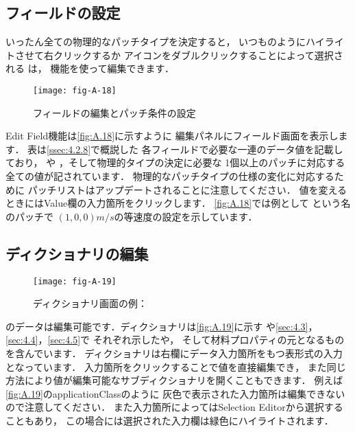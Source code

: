 \subsection{フィールドの設定}
\label{ssec:A.4.4}
いったん全ての物理的なパッチタイプを決定すると，
いつものようにハイライトさせて右クリックするか
アイコンをダブルクリックすることによって選択される
%
%
は，
機能を使って編集できます．


\begin{figure}[ht]
 \texttt{[image: fig-A-18]}
 \caption{フィールドの編集とパッチ条件の設定}
 \label{fig:A.18}
\end{figure}


Edit Field機能は\autoref{fig:A.18}に示すように
編集パネルにフィールド画面を表示します．
表は\autoref{ssec:4.2.8}で概説した
各フィールドで必要な一連のデータ値を記載しており，
%
%
や
%
%
，そして物理的タイプの決定に必要な
1個以上のパッチに対応する全ての値が記されています．
物理的なパッチタイプの仕様の変化に対応するために
パッチリストはアップデートされることに注意してください．
値を変えるときにはValue欄の入力箇所をクリックします．
\autoref{fig:A.18}では例として
という名のパッチで
$(1, 0, 0) \unit{m/s}$の等速度の設定を示しています．


\subsection{ディクショナリの編集}
\label{ssec:A.4.5}


\begin{figure}[ht]
 \texttt{[image: fig-A-19]}
 \caption{ディクショナリ画面の例：}
 \label{fig:A.19}
\end{figure}


%
%
のデータは編集可能です．ディクショナリは\autoref{fig:A.19}に示す
や\autoref{sec:4.3}，\autoref{sec:4.4}，\autoref{sec:4.5}で
それぞれ示したや，
そして材料プロパティの元となるものを含んでいます．
ディクショナリは右欄にデータ入力箇所をもつ表形式の入力となっています．
入力箇所をクリックすることで値を直接編集でき，
また同じ方法により値が編集可能なサブディクショナリを開くこともできます．
例えば\autoref{fig:A.19}のapplicationClassのように
灰色で表示された入力箇所は編集できないので注意してください．
また入力箇所によってはSelection Editorから選択することもあり，
この場合には選択された入力欄は緑色にハイライトされます．


